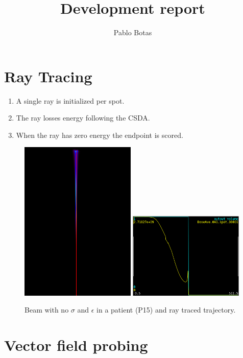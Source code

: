 \documentclass{article}
\title{Development report}
\author{Pablo Botas}
\begin{document}
\maketitle

\section{Ray Tracing}

\begin{enumerate}
    \item A single ray is initialized per spot.
    \item The ray losses energy following the CSDA.
    \item When the ray has zero energy the endpoint is scored.
\end{enumerate}

\begin{figure}[h]
    \includegraphics[width=0.49\textwidth, angle=90]{beam.png}
    \includegraphics[width=0.49\textwidth]{profile.png}
    \caption{Beam with no $\sigma$ and $\epsilon$ in a patient (P15) and ray traced trajectory.}
\end{figure}

\section{Vector field probing}
\end{document}

